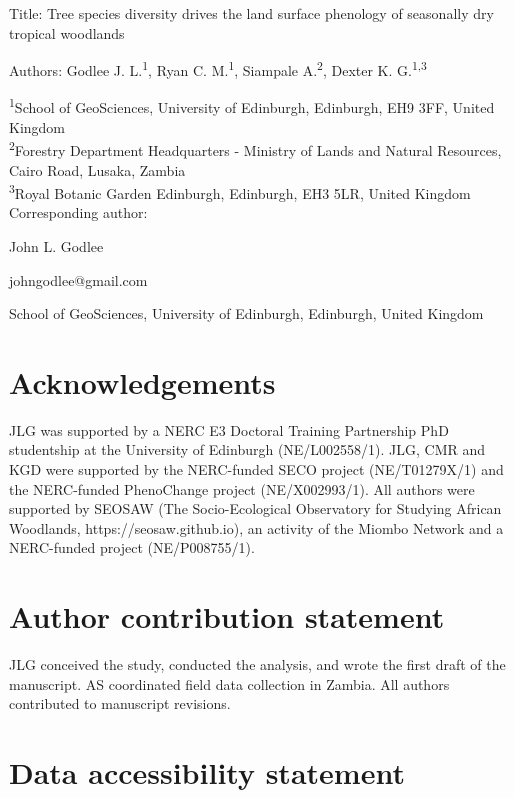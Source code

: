 \documentclass[11pt,a4paper]{article}
\begin{document}
{\Large{Title: Tree species diversity drives the land surface phenology of seasonally dry tropical woodlands}}

Authors: Godlee J. L.\textsuperscript{1}, Ryan C. M.\textsuperscript{1}, Siampale A.\textsuperscript{2}, Dexter K. G.\textsuperscript{1,3}

\textsuperscript{1}School of GeoSciences, University of Edinburgh, Edinburgh, EH9 3FF, United Kingdom \\
\textsuperscript{2}Forestry Department Headquarters - Ministry of Lands and Natural Resources, Cairo Road, Lusaka, Zambia \\
\textsuperscript{3}Royal Botanic Garden Edinburgh, Edinburgh, EH3 5LR, United Kingdom \\

\vspace{1em}
Corresponding author:

John L. Godlee

johngodlee@gmail.com

School of GeoSciences, University of Edinburgh, Edinburgh, United Kingdom

\section*{Acknowledgements}

JLG was supported by a NERC E3 Doctoral Training Partnership PhD studentship at
the University of Edinburgh (NE/L002558/1). JLG, CMR and KGD were supported by
the NERC-funded SECO project (NE/T01279X/1) and the NERC-funded PhenoChange
project (NE/X002993/1). All authors were supported by SEOSAW (The
Socio-Ecological Observatory for Studying African Woodlands,
https://seosaw.github.io), an activity of the Miombo Network and a NERC-funded
project (NE/P008755/1). 

\section*{Author contribution statement}

JLG conceived the study, conducted the analysis, and wrote the first draft of
the manuscript. AS coordinated field data collection in Zambia. All authors
contributed to manuscript revisions. 

\section*{Data accessibility statement}
\end{document}
